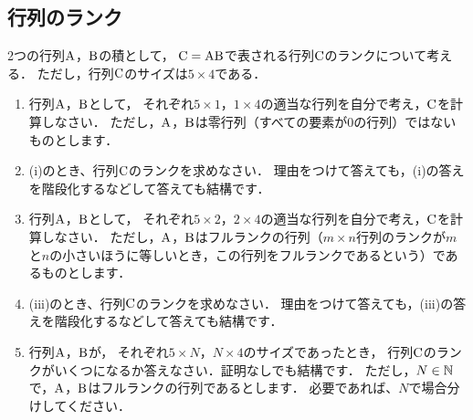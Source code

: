 \subsection{行列のランク}
  2つの行列$\mathrm{A}$，$\mathrm{B}$の積として，
  $\mathrm{C}=\mathrm{A}\mathrm{B}$で表される行列$\mathrm{C}$のランクについて考える．
  ただし，行列$\mathrm{C}$のサイズは$5\times 4$である．

  \begin{enumerate}[label=(\roman*)]
    \item 行列$\mathrm{A}$，$\mathrm{B}$として，
      それぞれ$5\times 1$，$1\times 4$の適当な行列を自分で考え，$\mathrm{C}$を計算しなさい．
      ただし，$\mathrm{A}$，$\mathrm{B}$は零行列（すべての要素が0の行列）ではないものとします．
    \item (i)のとき、行列$\mathrm{C}$のランクを求めなさい．
      理由をつけて答えても，(i)の答えを階段化するなどして答えても結構です．
    \item 行列$\mathrm{A}$，$\mathrm{B}$として，
      それぞれ$5\times 2$，$2\times 4$の適当な行列を自分で考え，$\mathrm{C}$を計算しなさい．
      ただし，$\mathrm{A}$，$\mathrm{B}$はフルランクの行列（$m\times n$行列のランクが$m$と$n$の小さいほうに等しいとき，この行列をフルランクであるという）であるものとします．
    \item (iii)のとき、行列$\mathrm{C}$のランクを求めなさい．
      理由をつけて答えても，(iii)の答えを階段化するなどして答えても結構です．
    \item 行列$\mathrm{A}$，$\mathrm{B}$が，
      それぞれ$5\times N$，$N\times 4$のサイズであったとき，
      行列$\mathrm{C}$のランクがいくつになるか答えなさい．証明なしでも結構です．
      ただし，$N\in \mathbb{N}$で，$\mathrm{A}$，$\mathrm{B}$はフルランクの行列であるとします．
      必要であれば、$N$で場合分けしてください．
  \end{enumerate}

